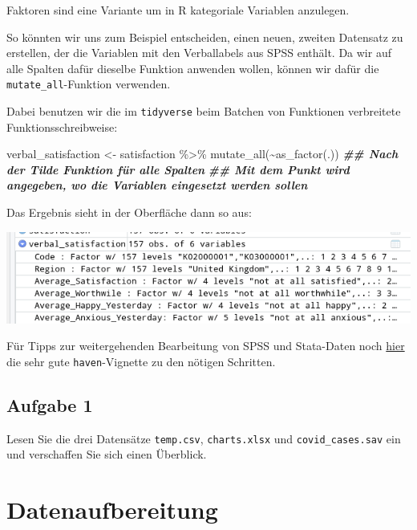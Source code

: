 \documentclass[
]{book}
\newenvironment{Shaded}{\begin{snugshade}}{\end{snugshade}}
\newcommand{\DocumentationTok}[1]{\textcolor[rgb]{0.56,0.35,0.01}{\textbf{\textit{#1}}}}
\newcommand{\FunctionTok}[1]{\textcolor[rgb]{0.00,0.00,0.00}{#1}}
\newcommand{\NormalTok}[1]{#1}
\newcommand{\OtherTok}[1]{\textcolor[rgb]{0.56,0.35,0.01}{#1}}
\newcommand{\SpecialCharTok}[1]{\textcolor[rgb]{0.00,0.00,0.00}{#1}}
\begin{document}
Faktoren sind eine Variante um in R kategoriale Variablen anzulegen.

So könnten wir uns zum Beispiel entscheiden, einen neuen, zweiten Datensatz zu erstellen, der die Variablen mit den Verballabels aus SPSS enthält.
Da wir auf alle Spalten dafür dieselbe Funktion anwenden wollen, können wir dafür die \texttt{mutate\_all}-Funktion verwenden.

Dabei benutzen wir die im \texttt{tidyverse} beim Batchen von Funktionen verbreitete Funktionsschreibweise:

\begin{Shaded}
\begin{Highlighting}[]
\NormalTok{verbal\_satisfaction }\OtherTok{\textless{}{-}}\NormalTok{ satisfaction }\SpecialCharTok{\%\textgreater{}\%} 
  \FunctionTok{mutate\_all}\NormalTok{(}\SpecialCharTok{\textasciitilde{}}\FunctionTok{as\_factor}\NormalTok{(.)) }\DocumentationTok{\#\# Nach der Tilde Funktion für alle Spalten}
\DocumentationTok{\#\# Mit dem Punkt wird angegeben, wo die Variablen eingesetzt werden sollen}
\end{Highlighting}
\end{Shaded}

Das Ergebnis sieht in der Oberfläche dann so aus:

\begin{center}\includegraphics[width=0.8\linewidth]{imgs/spss2} \end{center}

Für Tipps zur weitergehenden Bearbeitung von SPSS und Stata-Daten noch \href{https://www.rdocumentation.org/packages/haven/versions/2.2.0/vignettes/semantics.Rmd}{hier} die sehr gute \texttt{haven}-Vignette zu den nötigen Schritten.

\hypertarget{aufgabe-1-2}{%
\subsection{Aufgabe 1}\label{aufgabe-1-2}}

Lesen Sie die drei Datensätze \texttt{temp.csv}, \texttt{charts.xlsx} und \texttt{covid\_cases.sav} ein und verschaffen Sie sich einen Überblick.

\hypertarget{datenaufbereitung}{%
\section{Datenaufbereitung}\label{datenaufbereitung}}
\end{document}
